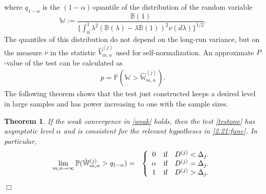 \documentclass[11pt]{article}
\newtheorem{theorem}{Theorem}[section]
\numberwithin{equation}{section}
\numberwithin{theorem}{section}
\numberwithin{lemma}{section}
\numberwithin{proposition}{section}
\numberwithin{cor}{section}
\numberwithin{definition}{section}
\numberwithin{cons}{section}
\numberwithin{rem}{section}
\numberwithin{exa}{section}
\numberwithin{table}{section}
\numberwithin{figure}{section}
\numberwithin{algo}{section}
\begin{document}
{{\begin{equation}
\end{equation}
  where $q_{1 - \alpha}$ is the $(1- \alpha)$-quantile of the distribution of the random
  variable
  \begin{equation}\label{wvar}
   \mathbb{W}:=  \frac {\mathbb{B}(1)}{ \{ \int^1_0 \lambda^2 (\mathbb{B}(\lambda) - \lambda \mathbb{B}(1))^{2} \nu (  d \lambda ) \}^{1/2}} .
\end{equation}
The quantiles of this distribution do not depend on the long-run variance, but on the measure $\nu$ in the statistic $  \hat V^{(j)}_{m,n} $
used for self-normalization. An  approximate $P$-value of the test can be calculated as
\begin{align}\label{p-val-calc}
  p= \mathbb{P}(\mathbb{W} > \hat{\mathbb{W}}^{(j)}_{m,n}).
\end{align}
The following theorem shows that the test just constructed keeps a desired level in large samples and has power increasing to one with the sample sizes.

\begin{theorem} \label{thm1}
If the weak convergence in \eqref{weak} holds, then the test \eqref{testone} has asymptotic level $\alpha$ and is consistent
 for the relevant hypotheses in \eqref{2.21:func}. In particular,
 \begin{eqnarray}\label{test-bev}
  \lim_{m,n \to \infty} \mathbb{P} ( \hat{\mathbb{W}}^{(j)}_{m,n}  > q_{1 - \alpha} ) &=& \left \{ \begin{array}{c@{\quad}cc}
                      0 & \mbox{if} & D^{(j)} < \Delta_j. \\
                      \alpha &  \mbox{if} & D^{(j)} = \Delta_j. \\
                      1 & \mbox{if} & D^{(j)} > \Delta_j.
                    \end{array} \right.
\end{eqnarray} \hfill $\Box$
\end{theorem}

}}
\end{document}
